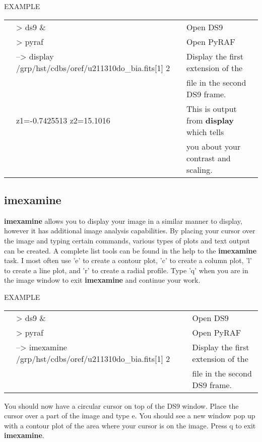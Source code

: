 EXAMPLE

\begin{minipage}{4.0in}
\setlength{\oddsidemargin}{0.25 in}
\setlength{\evensidemargin}{0.25 in}
\begin{tabular}{lll}
&{\color{RoyalBlue}> ds9 \&} & Open DS9 \\
&{\color{RoyalBlue}> pyraf} & Open PyRAF \\
&{\color{RoyalBlue}--> display /grp/hst/cdbs/oref/u211310do\_bia.fits[1] 2}& Display the first extension of the \\ && file in the second DS9 frame. \\
&{\color{Green}z1=-0.7425513 z2=15.1016} & This is output from {\bf display} which tells \\ && you about your contrast and scaling. \\
\end{tabular}
\end{minipage}

\subsection{{\bf imexamine}}
{\bf imexamine} allows you to display your image in a similar manner to display, however it has additional image analysis capabilities. By placing your cursor over the image and typing certain commands, various types of plots and text output can be created. A complete list tools can be found in the help to the {\bf imexamine} task. I most often use 'e' to create a contour plot, 'c' to create a column plot, 'l' to create a line plot, and 'r' to create a radial profile. Type 'q' when you are in the image window to exit {\bf imexamine} and continue your work.

EXAMPLE

\begin{minipage}{5.0in}
\setlength{\oddsidemargin}{0.25 in}
\setlength{\evensidemargin}{0.25 in}
\begin{tabular}{lll}
&{\color{RoyalBlue}> ds9 \&} & Open DS9 \\
&{\color{RoyalBlue}> pyraf} & Open PyRAF \\
&{\color{RoyalBlue}--> imexamine /grp/hst/cdbs/oref/u211310do\_bia.fits[1] 2}& Display the first extension of the \\ && file in the second DS9 frame. \\
\end{tabular}
You should now have a circular cursor on top of the DS9 window. Place the cursor over a part of the image and type e. You should see a new window pop up with a contour plot of the area where your cursor is on the image. Press q to exit {\bf imexamine}.
\end{minipage}

